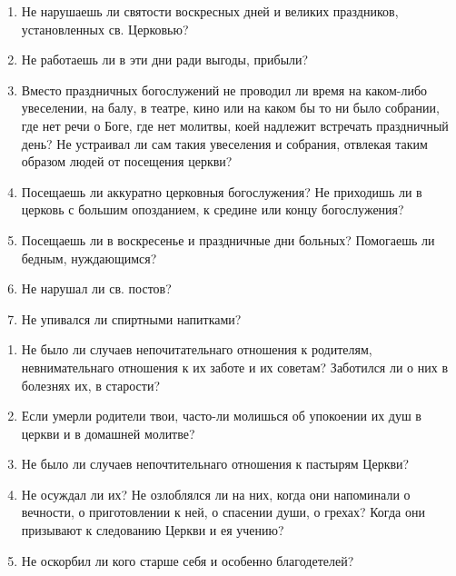 \nopagebreak

\begin{mymulticols}

\begin{enumerate}

\item Не нарушаешь ли святости воскресных дней и великих праздников, установленных св. Церковью?

\item Не работаешь ли в эти дни ради выгоды, прибыли?

\item Вместо праздничных богослужений не проводил ли время на каком-либо увеселении, на балу, в театре, кино или на каком бы то ни было собрании, где нет речи о Боге, где нет молитвы, коей надлежит встречать праздничный день? Не устраивал ли сам такия увеселения и собрания, отвлекая таким образом людей от посещения церкви?

\item Посещаешь ли аккуратно церковныя богослужения? Не приходишь ли в церковь с большим опозданием, к средине или концу богослужения?

\item Посещаешь ли в воскресенье и праздничные дни больных? Помогаешь ли бедным, нуждающимся?

\item Не нарушал ли св. постов?

\item Не упивался ли спиртными напитками? 
\end{enumerate}

\end{mymulticols}

\nopagebreak

\begin{mymulticols}

\begin{enumerate}

\item Не было ли случаев непочитательнаго отношения к родителям, невнимательнаго отношения к их заботе и их советам? Заботился ли о них в болезнях их, в старости?

\item Если умерли родители твои, часто-ли молишься об упокоении их душ в церкви и в домашней молитве?

\item Не было ли случаев непочтительнаго отношения к пастырям Церкви?

\item Не осуждал ли их? Не озлоблялся ли на них, когда они напоминали о вечности, о приготовлении к ней, о спасении души, о грехах? Когда они призывают к следованию Церкви и ея учению?

\item Не оскорбил ли кого старше себя и особенно благодетелей? 
\end{enumerate}

\end{mymulticols}

